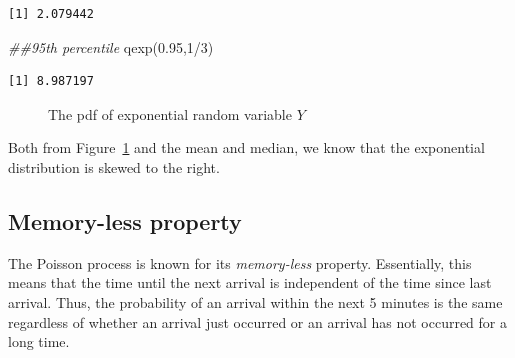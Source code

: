 \documentclass[
  letterpaper,
  DIV=11,
  numbers=noendperiod]{scrreprt}
\newenvironment{Shaded}{\begin{snugshade}}{\end{snugshade}}
\newcommand{\DecValTok}[1]{\textcolor[rgb]{0.68,0.00,0.00}{#1}}
\newcommand{\DocumentationTok}[1]{\textcolor[rgb]{0.37,0.37,0.37}{\textit{#1}}}
\newcommand{\FloatTok}[1]{\textcolor[rgb]{0.68,0.00,0.00}{#1}}
\newcommand{\FunctionTok}[1]{\textcolor[rgb]{0.28,0.35,0.67}{#1}}
\newcommand{\NormalTok}[1]{\textcolor[rgb]{0.00,0.23,0.31}{#1}}
\newcommand{\SpecialCharTok}[1]{\textcolor[rgb]{0.37,0.37,0.37}{#1}}
\begin{document}
\begin{verbatim}
[1] 2.079442
\end{verbatim}

\begin{Shaded}
\begin{Highlighting}[]
\DocumentationTok{\#\#95th percentile}
\FunctionTok{qexp}\NormalTok{(}\FloatTok{0.95}\NormalTok{,}\DecValTok{1}\SpecialCharTok{/}\DecValTok{3}\NormalTok{)}
\end{Highlighting}
\end{Shaded}

\begin{verbatim}
[1] 8.987197
\end{verbatim}

\begin{figure}


\caption{\label{fig-exp}The pdf of exponential random variable \(Y\)}

\end{figure}%

Both from Figure~\ref{fig-exp} and the mean and median, we know that the
exponential distribution is skewed to the right.

\subsection{Memory-less property}\label{memory-less-property}

The Poisson process is known for its \emph{memory-less} property.
Essentially, this means that the time until the next arrival is
independent of the time since last arrival. Thus, the probability of an
arrival within the next 5 minutes is the same regardless of whether an
arrival just occurred or an arrival has not occurred for a long time.
\end{document}
